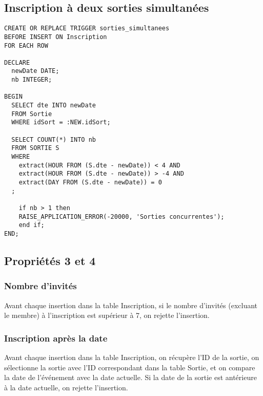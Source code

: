 \documentclass[11pt,letterpaper]{article}
\begin{document}
\subsection{Inscription à deux sorties simultanées}
\begin{lstlisting}[style=sql, label={lst:p4}]
CREATE OR REPLACE TRIGGER sorties_simultanees
BEFORE INSERT ON Inscription
FOR EACH ROW

DECLARE
  newDate DATE;
  nb INTEGER;

BEGIN
  SELECT dte INTO newDate
  FROM Sortie
  WHERE idSort = :NEW.idSort;
  
  SELECT COUNT(*) INTO nb
  FROM SORTIE S
  WHERE
    extract(HOUR FROM (S.dte - newDate)) < 4 AND
    extract(HOUR FROM (S.dte - newDate)) > -4 AND
    extract(DAY FROM (S.dte - newDate)) = 0
  ;

	if nb > 1 then
	RAISE_APPLICATION_ERROR(-20000, 'Sorties concurrentes');
	end if;
END;
\end{lstlisting}


\subsection{Propriétés 3 et 4}
\subsubsection*{Nombre d’invités}
Avant chaque insertion dans la table Inscription, si le nombre d’invités (excluant le membre) à l’inscription est supérieur à 7, on rejette l’insertion.

\subsubsection*{Inscription après la date}
Avant chaque insertion dans la table Inscription, on récupère l’ID de la sortie, on sélectionne la sortie avec l’ID correspondant dans la table Sortie, et on compare la date de l’événement avec la date actuelle. Si la date de la sortie est antérieure à la date actuelle, on rejette l’insertion.
\end{document}
